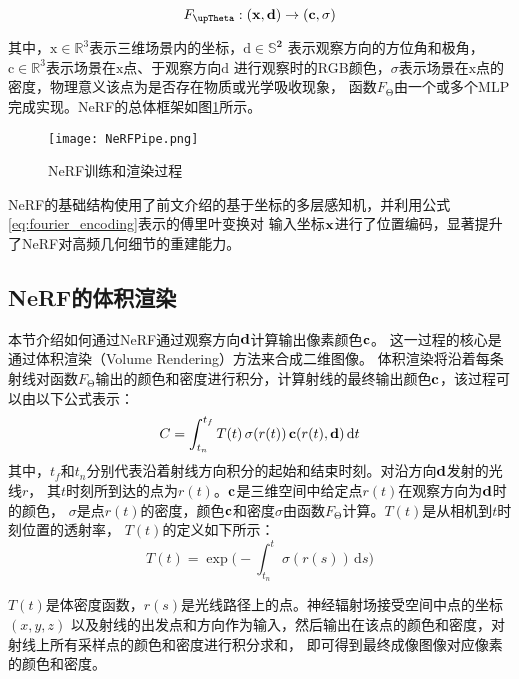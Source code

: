 \begin{equation}
  F_{\upTheta}:({\bf{x}}, {\bf{d}})\rightarrow({\bf{c}},\sigma)
  \label{eq:nerf_mapping}
\end{equation}

其中，$\mathrm{x}\in\mathbb{R}^3$表示三维场景内的坐标，$\mathrm{d}\in\mathbb{S}^\mathbf{2}$
表示观察方向的方位角和极角，$\mathrm{c}\in\mathbb{R}^3$表示场景在$\mathrm{x}$点、于观察方向$\mathrm{d}$
进行观察时的RGB颜色，$\sigma$表示场景在$\mathrm{x}$点的密度，物理意义该点为是否存在物质或光学吸收现象，
函数$F_{\upTheta}$由一个或多个MLP完成实现。NeRF的总体框架如图\ref{fig:nerf_pipe}所示。


\begin{figure}[htbp]
  \centering
  \texttt{[image: NeRFPipe.png]}
  \caption{NeRF训练和渲染过程\cite{Mildenhall_2020}}
  \label{fig:nerf_pipe}
\end{figure}

NeRF的基础结构使用了前文介绍的基于坐标的多层感知机，并利用公式\eqref{eq:fourier_encoding}表示的傅里叶变换对
输入坐标$\bf x$进行了位置编码，显著提升了NeRF对高频几何细节的重建能力。

\subsection{NeRF的体积渲染}

本节介绍如何通过NeRF通过观察方向$\bf d$计算输出像素颜色$\bf c$。
这一过程的核心是通过体积渲染（Volume Rendering）方法来合成二维图像。
体积渲染将沿着每条射线对函数$F_{\upTheta}$输出的颜色和密度进行积分，计算射线的最终输出颜色$\bf c$，该过程可以由以下公式表示：
\begin{equation}\label{eq:volume_rendering}
C=\int_{t_n}^{t_f}T(t)\,\sigma(r(t))\,{\bf c}(r(t),{\bf d})\,\mathrm{d}t
\end{equation}
其中，$t_f$和$t_n$分别代表沿着射线方向积分的起始和结束时刻。对沿方向$\bf{d}$发射的光线$r$，
其$t$时刻所到达的点为$r(t)$。$\bf{c}$是三维空间中给定点$r(t)$在观察方向为$\bf{d}$时的颜色，
$\sigma$是点$r(t)$的密度，颜色$\bf c$和密度$\sigma$由函数$F_{\upTheta}$计算。$T(t)$是从相机到$t$时刻位置的透射率，
$T(t)$的定义如下所示：
\begin{equation}\label{eq:transmittance}
T(t)=\exp\Biggl(-\int_{t_n}^{t}\sigma(r(s))\,\mathrm{d}s\Biggr)
\end{equation}

$T\left(t\right)$是体密度函数，$r\left(s\right)$是光线路径上的点。神经辐射场接受空间中点的坐标$\left(x,y,z\right)$
以及射线的出发点和方向作为输入，然后输出在该点的颜色和密度，对射线上所有采样点的颜色和密度进行积分求和，
即可得到最终成像图像对应像素的颜色和密度。

